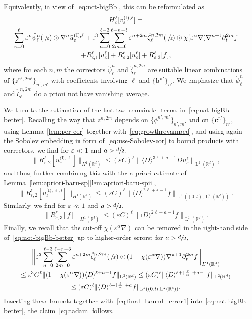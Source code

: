 \documentclass[10pt]{amsart}
\theoremstyle{plain}
\theoremstyle{definition}
\numberwithin{equation}{section}
\newcommand{\e}{\varepsilon}
\newcommand{\R}{\mathbb R}
\newcommand{\bb}{{\boldsymbol b}}
\newcommand{\cc}{{\boldsymbol c}}
\newcommand{\Ld}{\operatorname{L}}
\begin{document}
Equivalently, in view of~\eqref{eq:not-bigBb}, this can be reformulated as
\begin{multline}\label{eq:not-bigBb-better}
H^\ell_\e[\bar v_\e^{\text{(I)},\ell}]
=\\
\sum_{n=0}^\ell\e^{n}\mathring\psi_\ell^{n}(\sfrac{\cdot}{\e})\odot\nabla^{n}\bar{u}^{\text{(I)},\ell}_{\e}
+\e^3\sum_{n=0}^{\ell-3}\sum_{2m=0}^{\ell-n-3}\e^{n+2m}\mathring\zeta_\ell^{n,2m}(\sfrac\cdot\e)\odot\chi(\e^{\alpha}\nabla)\nabla^{n+1}\partial_t^{2m}f\\
+R^{\ell}_{\e,1}[\bar u_{\e}^{\ell}]+R^{\ell}_{\e,2}[\bar u_{\e}^{\ell}]+R^{\ell}_{\e,3}[f],
\end{multline}
{where for each $n,m$ the correctors $\mathring\psi^n_\ell$ and $\mathring\zeta^{n,2m}_\ell$ are suitable linear combinations of $\{z^{n',2m'}\}_{n',m'}$ with coefficients involving $\ell$ and $\{\bar\bb{}^{n'}\}_{n'}$.}
We emphasize that $\mathring\psi^n_\ell$ and $\mathring\zeta^{n,2m}_\ell$ do a priori not have vanishing average.

We turn to the estimation of the last two remainder terms in~\eqref{eq:not-bigBb-better}.
Recalling the way that $z^{n,2m}$ {depends on $\{\phi^{n',m'}\}_{n',m'}$ and on $\{\cc^{n'}\}_{n'}$}, using Lemma~\ref{lem:per-cor} together with~\eqref{eq:growthrevamped}, and using again the Sobolev embedding in form of~\eqref{eq:use-Sobolev-cor} to bound products with correctors, we find for $\e\ll1$ and $a>\sfrac d2$,
\begin{equation*}
\|R_{\e,2}^\ell[\bar u_\e^{\text{(I)},\ell}]\|_{H^1(\R^d)}
\le (\e C)^{\ell}\|\langle D\rangle^{3\ell+a-1}D\bar u_\e^\ell\|_{\Ld^2(\R^d)},
\end{equation*}
and thus, further combining {this} with the a priori estimate of Lemma~\ref{lem:apriori-baru-sp}\eqref{lem:apriori-baru-spii},
\[\|R_{\e,2}^\ell[\bar u_\e^{\text{(I)},\ell;t}]\|_{H^1(\R^d)}\le (\e C)^{\ell}\|\langle D\rangle^{3\ell+a-1}f\|_{\Ld^1((0,t);\Ld^2(\R^d))}.\]
Similarly, we find for $\e\ll1$ and $a>\sfrac d2$,
\[\|R_{\e,3}^\ell[f]\|_{H^1(\R^d)}\le (\e C)^{\ell}\|\langle D\rangle^{2\ell+a-1}f\|_{\Ld^2(\R^d)}.\]
Finally, we recall that the cut-off $\chi(\e^\alpha\nabla)$ can be removed in the right-hand side of~\eqref{eq:not-bigBb-better} up to higher-order errors: for $a>\sfrac d2$,
\begin{multline*}
{\bigg\|\e^3\sum_{n=0}^{\ell-3}\sum_{2m=0}^{\ell-n-3}\e^{n+2m}\mathring\zeta_\ell^{n,2m}(\sfrac\cdot\e)\odot(1-\chi(\e^{\alpha}\nabla))\nabla^{n+1}\partial_t^{2m}f\bigg\|_{H^1(\R^d)}}\\
\le \e^3C^\ell\|(1-\chi(\e^{\alpha}\nabla))\langle D\rangle^{\ell+a-1}f\|_{\Ld^2(\R^d)}
\le (\e C)^{\ell}\|\langle D\rangle^{\ell+{\lceil\frac{\ell}\alpha\rceil}+a-1}f\|_{\Ld^2(\R^d)}\\
{\le (\e C)^{\ell}\|\langle D\rangle^{\ell+{\lceil\frac{\ell}\alpha\rceil}+a}f\|_{\Ld^1((0,t);\Ld^2(\R^d))}} .
\end{multline*}
Inserting these bounds together with~\eqref{eq:final_bound_error1} into~\eqref{eq:not-bigBb-better}, the claim~\eqref{eq:tadam} follows.
\end{document}
